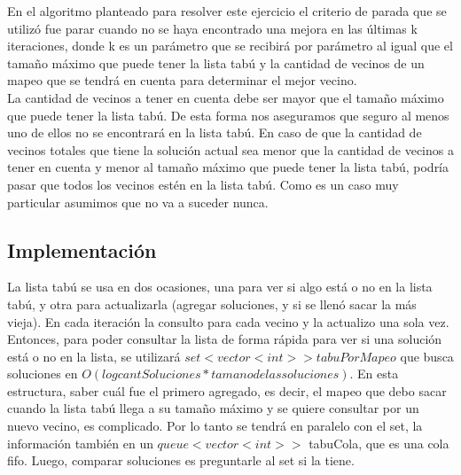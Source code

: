 En el algoritmo planteado para resolver este ejercicio el criterio de parada que se utilizó fue parar cuando no se haya encontrado una mejora en las últimas k iteraciones, donde k es un parámetro que se recibirá por parámetro al igual que el tamaño máximo que puede tener la lista tabú y la cantidad de vecinos de un mapeo que se tendrá en cuenta para determinar el mejor vecino.\\
La cantidad de vecinos a tener en cuenta debe ser mayor que el tamaño máximo que puede tener la lista tabú. De esta forma nos aseguramos que seguro al menos uno de ellos no se encontrará en la lista tabú. En caso de que la cantidad de vecinos totales que tiene la solución actual sea menor que la cantidad de vecinos a tener en cuenta y menor al tamaño máximo que puede tener la lista tabú, podría pasar que todos los vecinos estén en la lista tabú. Como es un caso muy particular asumimos que no va a suceder nunca.

\subsection{Implementación}
\noindent La lista tabú se usa en dos ocasiones, una para ver si algo está o no en la lista tabú, y otra para actualizarla (agregar soluciones, y si se llenó sacar la más vieja). En cada iteración la consulto para cada vecino y la actualizo una sola vez. Entonces, para poder consultar la lista de forma rápida para ver si una solución está o no en la lista, se utilizará $set<vector<int>> tabuPorMapeo$ que busca soluciones en $O(log cantSoluciones * tamano de las soluciones)$. En esta estructura, saber cuál fue el primero agregado, es decir, el mapeo que debo sacar cuando la lista tabú llega a su tamaño máximo y se quiere consultar por un nuevo vecino, es complicado. Por lo tanto se tendrá en paralelo con el set, la información también en un $queue<vector<int> >$ tabuCola, que es una cola fifo. Luego, comparar soluciones es preguntarle al set si la tiene.

